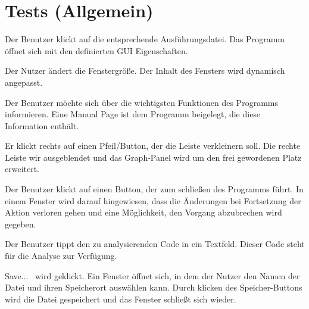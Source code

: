 \section{Tests (Allgemein)}



{Der Benutzer klickt auf die entsprechende Ausführungsdatei.}
{Das Programm öffnet sich mit den definierten GUI Eigenschaften.}

{Der Nutzer ändert die Fenstergröße.}
{Der Inhalt des Fensters wird dynamisch angepasst.}

{Der Benutzer möchte sich über die wichtigsten Funktionen des Programms informieren.}
{Eine Manual Page ist dem Programm beigelegt, die diese Information enthält.}

{Er klickt rechts auf einen Pfeil/Button, der die Leiste verkleinern soll.}
{Die rechte Leiste wir ausgeblendet und das Graph-Panel wird um den frei gewordenen Platz erweitert.}

{Der Benutzer klickt auf einen Button, der zum schließen des Programms führt.}
{In einem Fenster wird darauf hingewiesen, dass die Änderungen bei Fortsetzung der Aktion verloren gehen und eine Möglichkeit, den Vorgang abzubrechen wird gegeben.}




{Der Benutzer tippt den zu analysierenden Code in ein Textfeld.}
{Dieser Code steht für die Analyse zur Verfügung.}

{\glqq Save... \grqq\ wird geklickt.}
{Ein Fenster öffnet sich, in dem der Nutzer den Namen der Datei und ihren Speicherort auswählen kann. Durch klicken des \glqq Speicher\grqq -Buttons wird die Datei gespeichert und das Fenster schließt sich wieder.}


